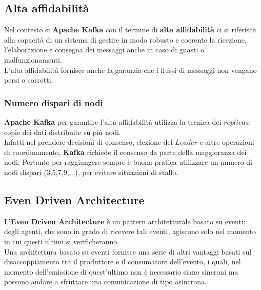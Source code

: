 \subsection{Alta affidabilità}
Nel contesto si \textbf{Apache Kafka} con il termine di \textbf{alta affidabilità} ci si riferisce alla capacità di un sistema di gestire in modo
robusto e coerente la ricezione, l'elaborazione e consegna dei messaggi anche in caso di guasti o malfunzionamenti.\\
L'alta affidabilità fornisce anche la garanzia che i flussi di messaggi non vengano persi o corrotti.
\subsubsection{Numero dispari di nodi}
\textbf{Apache Kafka} per garantire l'alta affidabilità utilizza la tecnica dei $replicas$: copie dei dati distribuite su più nodi.\\
Infatti nel prendere decisioni di consenso, elezione del $Leader$ e altre operazioni di coordinamento, \textbf{Kafka} richiede il consenso 
da parte della maggioranza dei nodi. Pertanto per raggiungere sempre è buona pratica utilizzare un numero di nodi dispari (3,5,7,9,...), per evitare situazioni di stallo.\\

\subsection{Even Driven Architecture}
L'\textbf{Even Driven Architecture} è un pattern architetturale basato su eventi: degli agenti, che sono in grado di ricevere tali eventi, agiscono solo nel momento in cui questi ultimi si verificheranno. 
\\Una architettura basato su eventi fornisce una serie di altri vantaggi basati sul disaccoppiamento tra il produttore e il consumatore dell'evento, i quali, nel momento dell'emissione di quest'ultimo non è necessario siano sincroni ma possono andare a sfruttare una comunicazione di tipo asincrona. 
